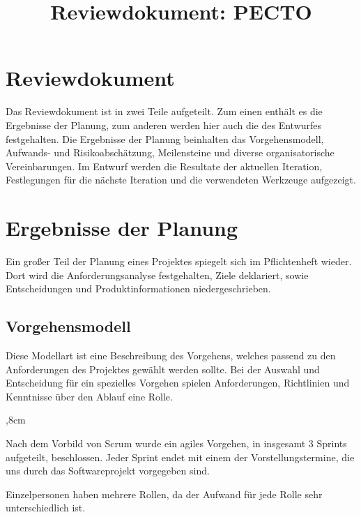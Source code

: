 \documentclass[a4paper, 11pt, ngerman, fleqn]{article}
\begin{document}
\title{Reviewdokument: PECTO}
\vspace{3 in}
\maketitle
\clearpage

\section*{Reviewdokument}
Das Reviewdokument ist in zwei Teile aufgeteilt. 
Zum einen enthält es die Ergebnisse der Planung, zum anderen werden hier auch die des Entwurfes festgehalten.
Die Ergebnisse der Planung beinhalten das Vorgehensmodell, Aufwands- und Risikoabschätzung, Meilensteine und diverse organisatorische Vereinbarungen. Im Entwurf werden die Resultate der aktuellen Iteration, Festlegungen für die nächste Iteration und die verwendeten Werkzeuge aufgezeigt.

\section{Ergebnisse der Planung}

Ein großer Teil der Planung eines Projektes spiegelt sich im Pflichtenheft wieder. Dort wird die Anforderungsanalyse festgehalten, Ziele deklariert, sowie Entscheidungen und Produktinformationen niedergeschrieben.

\subsection{Vorgehensmodell}

Diese Modellart ist eine Beschreibung des Vorgehens, welches passend zu den Anforderungen des Projektes gewählt werden sollte. 
Bei der Auswahl und Entscheidung für ein spezielles Vorgehen spielen Anforderungen, Richtlinien und Kenntnisse über den Ablauf eine Rolle.

	\begin{description}
	,8cm
		\item[Gewähltes Vorgehen:] Nach dem Vorbild von Scrum wurde ein agiles Vorgehen, in insgesamt 3 Sprints aufgeteilt, beschlossen. 
		Jeder Sprint endet mit einem der Vorstellungstermine, die uns durch das Softwareprojekt vorgegeben sind. 
		
		\item[Projektspezifische Anpassungen:] Einzelpersonen haben mehrere Rollen, da der Aufwand für jede Rolle sehr unterschiedlich ist.
	\end{description} 
	
\end{document}
